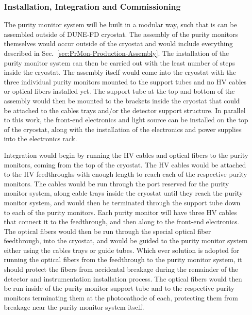 





\subsubsection{Installation, Integration and Commissioning}
\label{sec:PrMon-Install-Integrate-Commission}
The purity monitor system will be built in a modular way, such that is can be assembled outside of DUNE-FD cryostat.  The assembly of the purity monitors themselves would occur outside of the cryostat and would include everything described in Sec.~\ref{sec:PrMon-Production-Assembly}.  The installation of the purity monitor system can then be carried out with the least number of steps inside the cryostat.  The assembly itself would come into the cryostat with the three individual purity monitors mounted to the support tubes and no HV cables or optical fibers installed yet.  The support tube at the top and bottom of the assembly would then be mounted to the brackets inside the cryostat that could be attached to the cables trays and/or the detector support structure.  In parallel to this work, the front-end electronics and light source can be installed on the top of the cryostat, along with the installation of the electronics and power supplies into the electronics rack.  

Integration would begin by running the HV cables and optical fibers to the purity monitors, coming from the top of the cryostat.  The HV cables would be attached to the HV feedthroughs with enough length to reach each of the respective purity monitors.  The cables would be run through the port reserved for the purity monitor system, along cable trays inside the cryostat until they reach the purity monitor system, and would then be terminated through the support tube down to each of the purity monitors.  Each purity monitor will have three HV cables that connect it to the feedthrough, and then along to the front-end electronics.  The optical fibers would then be run through the special optical fiber feedthrough, into the cryostat, and would be guided to the purity monitor system either using the cables trays or guide tubes.  Which ever solution is adopted for running the optical fibers from the feedthrough to the purity monitor system, it should protect the fibers from accidental breakage during the remainder of the detector and instrumentation installation process.  The optical fibers would then be run inside of the purity monitor support tube and to the respective purity monitors terminating them at the photocathode of each, protecting them from breakage near the purity monitor system itself.

